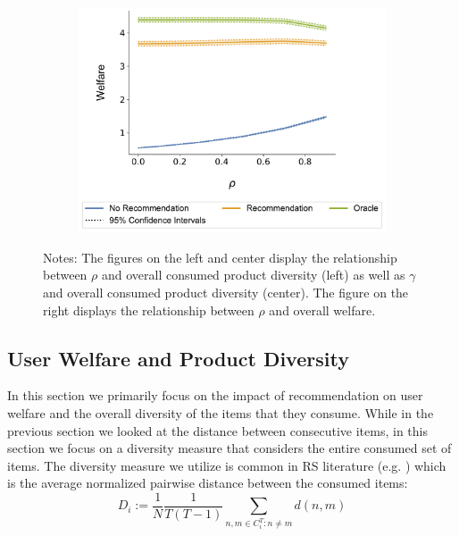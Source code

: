 \documentclass[manuscript]{acmart}
\begin{document}
\begin{figure}[ht]
\begin{subfigure}{0.3\linewidth}
  \includegraphics[width=1.0\linewidth]{figures/rho_welfare_N_200_T_20.pdf}
\end{subfigure}
\caption*{\scriptsize Notes: The figures on the left and center display the relationship between $\rho$ and overall consumed product diversity (left) as well as $\gamma$ and overall consumed product diversity (center). The figure on the right displays the relationship between $\rho$ and overall welfare.}
\end{figure}

\addtocounter{figure}{-1}
\subsection{User Welfare and Product Diversity}
In this section we primarily focus on the impact of recommendation on user welfare and the overall diversity of the items that they consume. While in the previous section we looked at the distance between consecutive items, in this section we focus on a diversity measure that considers the entire consumed set of items. The diversity measure we utilize is common in RS literature (e.g. \cite{ziegler2005improving}) which is the average normalized pairwise distance between the consumed items:
$$D_i:=\frac{1}{N}\frac{1}{T(T-1)}\sum_{n,m \in C_i^T: n \ne m} d(n,m)$$
\end{document}
